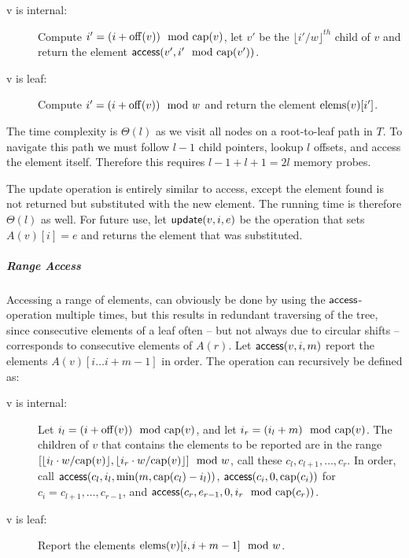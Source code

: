 \begin{description} 
    \item[\quad v is internal:] Compute $i' = (i + \mathrm{off}(v))
        \mod {\mathrm{cap}}(v)$, let $v'$ be the $\lfloor i' / w \rfloor^{th}$ child of $v$ and return the element
    $\mathsf{access}(v', i' \mod {\mathrm{cap}}(v'))$. 
    
\item[\quad v is leaf:] Compute $i' = (i + \mathrm{off}(v)) \mod w$
    and return the element $\mathrm{elems}(v)[i']$.
    \end{description}

The time complexity is $\Theta(l)$ as we visit all nodes on a root-to-leaf path in $T$. To navigate this path we must follow $l - 1$ child pointers, lookup $l$ offsets, and access the element itself. Therefore this requires $l - 1 + l + 1 = 2l$ memory probes.

The update operation is entirely similar to access, except
the element found is not returned but substituted with the new element. The
running time is therefore $\Theta(l)$ as well. For future use, let $\mathsf{update}(v, i, e)$ be the operation that sets $A(v)[i] = e$ and returns the element that was
substituted. 

\subparagraph*{Range Access}

Accessing a range of elements, can obviously be done by using the
$\mathsf{access}$-operation multiple times, but this results in redundant traversing
of the tree, since consecutive elements of a leaf often
-- but not always due to circular shifts -- corresponds to consecutive elements of $A(r)$.
Let $\mathsf{access}(v, i, m)$ report the
elements $A(v)[i \ldots i + m - 1]$ in order. The operation can recursively
be defined as:

\begin{description} \item[\quad v is internal:] 
    Let $i_l = (i + \mathrm{off}(v)) \mod {\mathrm{cap}}(v)$,
    and let $i_r = (i_l + m) \mod {\mathrm{cap}}(v)$. The children of
    $v$ that contains the elements to be reported are in the range $[\lfloor i_l \cdot w / \mathrm{cap}(v) \rfloor, \lfloor i_r \cdot w / \mathrm{cap}(v) \rfloor] \mod w$,
    call these $c_l, c_{l+1},
    \ldots, c_r$. In order, call $\mathsf{access}(c_l, i_l, \min(m, \mathrm{cap}(c_l) -
    i_l))$, $\mathsf{access}(c_i, 0, \mathrm{cap}(c_i))$ for $c_i = c_{l+1}, \ldots,
    c_{r-1}$, and $\mathsf{access}(c_r, e_{r-1}, 0, i_r \mod {\mathrm{cap}}(c_r))$.
	
        \item[\quad v is leaf:] Report the elements $\mathrm{elems}(v)[i, i+m-1] \mod w$. \end{description}

